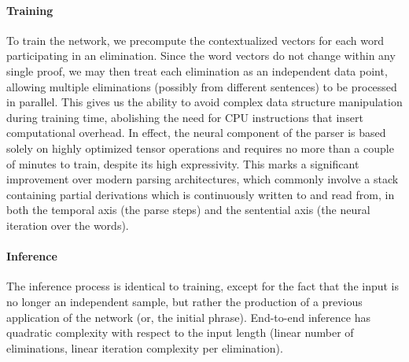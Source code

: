 \paragraph{Training}
To train the network, we precompute the contextualized vectors for each word participating in an elimination. 
Since the word vectors do not change within any single proof, we may then treat each elimination as an independent data point, allowing multiple eliminations (possibly from different sentences) to be processed in parallel.
This gives us the ability to avoid complex data structure manipulation during training time, abolishing the need for CPU instructions that insert computational overhead.
In effect, the neural component of the parser is based solely on highly optimized tensor operations and requires no more than a couple of minutes to train, despite its high expressivity.
This marks a significant improvement over modern parsing architectures, which commonly involve a stack containing partial derivations which is continuously written to and read from, in both the temporal axis (the parse steps) and the sentential axis (the neural iteration over the words).

\paragraph{Inference}
The inference process is identical to training, except for the fact that the input is no longer an independent sample, but rather the production of a previous application of the network (or, the initial phrase).
End-to-end inference has quadratic complexity with respect to the input length (linear number of eliminations, linear iteration complexity per elimination).

